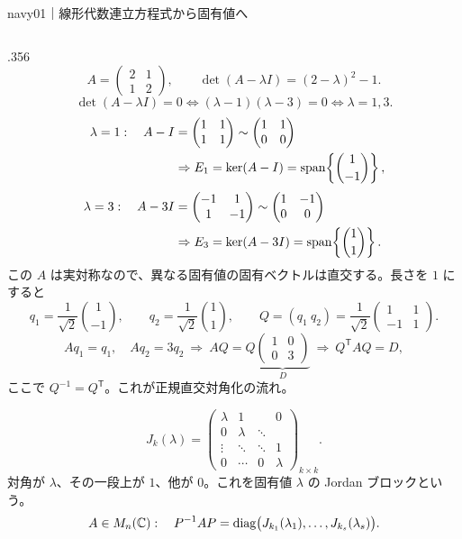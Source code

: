 \begin{sheetframe}{navy}{01｜線形代数}{連立方程式から固有値へ}
\begin{columns}[T,onlytextwidth]
\begin{column}{.356\textwidth}
\[
A=
\begin{pmatrix}2&1\\1&2\end{pmatrix},
\qquad
\det(A-\lambda I)
=(2-\lambda)^2-1.
\]
\[
\det(A-\lambda I)=0
\iff(\lambda-1)(\lambda-3)=0
\iff\lambda=1,3.
\]
\[
\begin{aligned}
\lambda=1:\quad
A-I
&=\begin{pmatrix}1&1\\1&1\end{pmatrix}
\sim\begin{pmatrix}1&1\\0&0\end{pmatrix}\\
&\Rightarrow
E_1=\ker(A-I)
=\operatorname{span}\!\left\{\binom{1}{-1}\right\},\\[1mm]
\lambda=3:\quad
A-3I
&=\begin{pmatrix}-1&1\\1&-1\end{pmatrix}
\sim\begin{pmatrix}1&-1\\0&0\end{pmatrix}\\
&\Rightarrow
E_3=\ker(A-3I)
=\operatorname{span}\!\left\{\binom{1}{1}\right\}.
\end{aligned}
\]
この $A$ は実対称なので、異なる固有値の固有ベクトルは直交する。長さを $1$ にすると
\[
q_1=\frac1{\sqrt2}\binom{1}{-1},\qquad
q_2=\frac1{\sqrt2}\binom{1}{1},\qquad
Q=(q_1\ q_2)=\frac1{\sqrt2}
\begin{pmatrix}1&1\\-1&1\end{pmatrix}.
\]
\[
 Aq_1=q_1,\quad Aq_2=3q_2
\ \Longrightarrow\
AQ=Q\underbrace{\begin{pmatrix}1&0\\0&3\end{pmatrix}}_{D}
\ \Longrightarrow\
\boxed{Q^{\mathsf T}AQ=D},
\]
ここで $Q^{-1}=Q^{\mathsf T}$。これが正規直交対角化の流れ。

\separator
{}
\[
J_k(\lambda)=
\left(\begin{smallmatrix}
\lambda&1&&0\\
0&\lambda&\ddots&\\
\vdots&\ddots&\ddots&1\\
0&\cdots&0&\lambda
\end{smallmatrix}\right)_{k\times k}.
\]
対角が $\lambda$、その一段上が $1$、他が $0$。これを固有値 $\lambda$ の Jordan ブロックという。
\[
A\in M_n(\mathbb{C}):\quad
P^{-1}AP=\operatorname{diag}\bigl(J_{k_1}(\lambda_1),\ldots,J_{k_s}(\lambda_s)\bigr).
\]


\end{column}
\end{columns}
\end{sheetframe}
